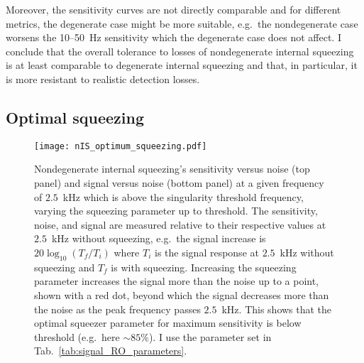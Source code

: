 Moreover, the sensitivity curves are not directly comparable and for different metrics, the degenerate case might be more suitable, e.g.\ the nondegenerate case worsens the 10--50~Hz sensitivity which the degenerate case does not affect. %
I conclude that the overall tolerance to losses of nondegenerate internal squeezing is at least comparable to degenerate internal squeezing and that, in particular, it is more resistant to realistic detection losses.


\subsection{Optimal squeezing}
\label{sec:nIS_optimal_squeezing}

\begin{figure}[ht]
	\centering
	\texttt{[image: nIS\_optimum\_squeezing.pdf]}
	\caption{ Nondegenerate internal squeezing's sensitivity versus noise (top panel) and signal versus noise (bottom panel) at a given frequency of $2.5$~kHz which is above the singularity threshold frequency, varying the squeezing parameter up to threshold. The sensitivity, noise, and signal are measured relative to their respective values at $2.5$~kHz without squeezing, e.g.\ the signal increase is $20\log_{10}(T_f/T_i)$ where $T_i$ is the signal response at $2.5$~kHz without squeezing and $T_f$ is with squeezing. Increasing the squeezing parameter increases the signal more than the noise up to a point, shown with a red dot, beyond which the signal decreases more than the noise as the peak frequency passes $2.5$~kHz. This shows that the optimal squeezer parameter for maximum sensitivity is below threshold (e.g.\ here $\sim85\%$). I use the parameter set in Tab.~\ref{tab:signal_RO_parameters}.
    }
	\label{fig:nIS_optimum_squeezing}
\end{figure}

